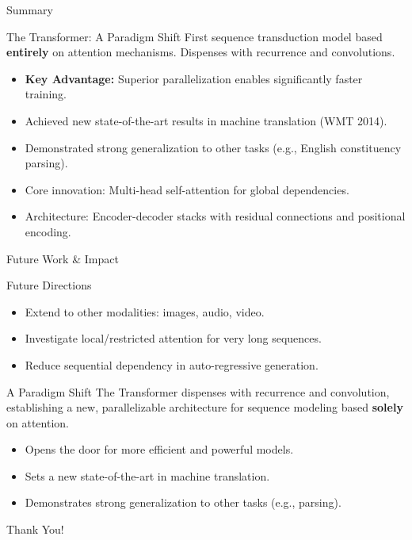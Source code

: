 \documentclass[
	11pt,
	aspectratio=169,
]{beamer}
\begin{document}
\begin{frame}{Summary}
    \begin{block}{The Transformer: A Paradigm Shift}
First sequence transduction model based \textbf{entirely} on attention mechanisms. Dispenses with recurrence and convolutions.
\end{block}

\begin{itemize}
    \item \textbf{Key Advantage:} Superior parallelization enables significantly faster training.
    \item Achieved new state-of-the-art results in machine translation (WMT 2014).
    \item Demonstrated strong generalization to other tasks (e.g., English constituency parsing).
    \item Core innovation: Multi-head self-attention for global dependencies.
    \item Architecture: Encoder-decoder stacks with residual connections and positional encoding.
\end{itemize}
\end{frame}
\begin{frame}{Future Work \& Impact}
    \begin{block}{Future Directions}
    \begin{itemize}
        \item Extend to other modalities: images, audio, video.
        \item Investigate local/restricted attention for very long sequences.
        \item Reduce sequential dependency in auto-regressive generation.
    \end{itemize}
\end{block}

\begin{block}{A Paradigm Shift}
    The Transformer dispenses with recurrence and convolution, establishing a new, parallelizable architecture for sequence modeling based \textbf{solely} on attention.
\end{block}

\begin{itemize}
    \item Opens the door for more efficient and powerful models.
    \item Sets a new state-of-the-art in machine translation.
    \item Demonstrates strong generalization to other tasks (e.g., parsing).
\end{itemize}
\end{frame}
\begin{frame}
    \centering
    \Huge \color{mathblue} Thank You!
\end{frame}
\end{document}
